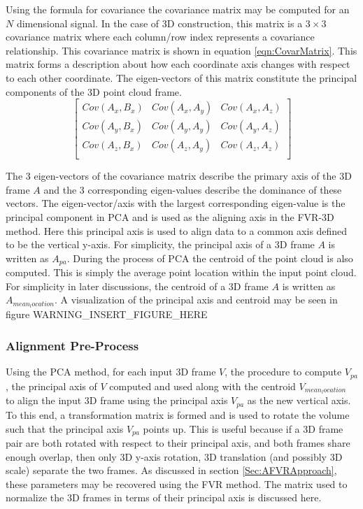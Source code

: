 Using the formula for covariance the covariance matrix may be computed for an $N$ dimensional signal. In the case of 3D construction, this matrix is a $3 \times 3$ covariance matrix where each column/row index represents a covariance relationship. This covariance matrix is shown in equation \ref{eqn:CovarMatrix}. This matrix forms a description about how each coordinate axis changes with respect to each other coordinate. The eigen-vectors of this matrix constitute the principal components of the 3D point cloud frame. \\

\begin{equation} \label{eqn:CovarMatrix}
\left[
\begin{array}{ccc}
Cov(A_x, B_x) & Cov(A_x, A_y) & Cov(A_x, A_z) \\
Cov(A_y, B_x) & Cov(A_y, A_y) & Cov(A_y, A_z) \\
Cov(A_z, B_x) & Cov(A_z, A_y) & Cov(A_z, A_z) \\
\end{array}
\right]
\end{equation}

The 3 eigen-vectors of the covariance matrix describe the primary axis of the 3D frame $A$ and the 3 corresponding eigen-values describe the dominance of these vectors. The eigen-vector/axis with the largest corresponding eigen-value is the principal component in PCA and is used as the aligning axis in the FVR-3D method. Here this principal axis is used to align data to a common axis defined to be the vertical y-axis. For simplicity, the principal axis of a 3D frame $A$ is written as $A_{pa}$. During the process of PCA the centroid of the point cloud is also computed. This is simply the average point location within the input point cloud. For simplicity in later discussions, the centroid of a 3D frame $A$ is written as $A_{mean_location}$. A visualization of the principal axis and centroid may be seen in figure WARNING_INSERT_FIGURE_HERE \\

\subsubsection{Alignment Pre-Process}

Using the PCA method, for each input 3D frame $V$, the procedure to compute $V_{pa}$, the principal axis of $V$ computed and used along with the centroid $V_{mean_location}$ to align the input 3D frame using the principal axis $V_{pa}$ as the new vertical axis. To this end, a transformation matrix is formed and is used to rotate the volume such that the principal axis $V_{pa}$ points up. This is useful because if a 3D frame pair are both rotated with respect to their principal axis, and both frames share enough overlap, then only 3D y-axis rotation, 3D translation (and possibly 3D scale) separate the two frames. As discussed in section \ref{Sec:AFVRApproach}, these parameters may be recovered using the FVR method. The matrix used to normalize the 3D frames in terms of their principal axis is discussed here. \\

